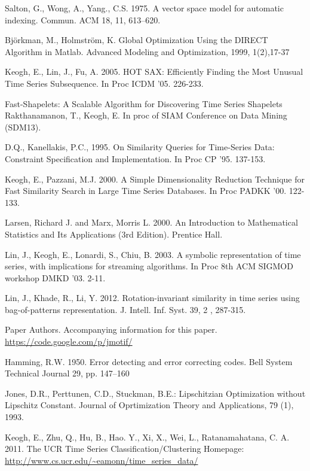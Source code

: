 \documentclass{llncs}
\begin{document}
\begin{thebibliography}{5}
Salton, G., Wong, A., Yang., C.S. 1975.
A vector space model for automatic indexing. 
Commun. ACM 18, 11, 613--620.

Björkman, M., Holmström, K.
Global Optimization Using the DIRECT Algorithm in Matlab.
Advanced Modeling and Optimization, 1999, 1(2),17-37

Keogh, E., Lin, J., Fu, A. 2005.
HOT SAX: Efficiently Finding the Most Unusual Time Series Subsequence. 
In Proc ICDM '05. 226-233.

Fast-Shapelets: A Scalable Algorithm for Discovering Time Series Shapelets
Rakthanamanon, T., Keogh, E.
In proc of SIAM Conference on Data Mining (SDM13).

D.Q., Kanellakis, P.C., 1995.
On Similarity Queries for Time-Series Data: Constraint Specification and Implementation. 
In Proc CP '95. 137-153.

Keogh, E., Pazzani, M.J. 2000.
A Simple Dimensionality Reduction Technique for Fast Similarity Search in Large Time Series
Databases. 
In Proc PADKK '00. 122-133.

Larsen, Richard J. and Marx, Morris L. 2000. 
An Introduction to Mathematical Statistics and Its Applications (3rd Edition).
Prentice Hall.

Lin, J., Keogh, E., Lonardi, S., Chiu, B. 2003.
A symbolic representation of time series, with implications for streaming algorithms. 
In Proc 8th ACM SIGMOD workshop DMKD '03. 2-11.

Lin, J., Khade, R., Li, Y. 2012.
Rotation-invariant similarity in time series using bag-of-patterns representation. 
J. Intell. Inf. Syst. 39, 2 , 287-315.

Paper Authors. 
Accompanying information for this paper. 
\url{https://code.google.com/p/jmotif/}

Hamming, R.W. 1950.
Error detecting and error correcting codes. 
Bell System Technical Journal 29, pp. 147--160

Jones, D.R., Perttunen, C.D., Stuckman, B.E.:
Lipschitzian Optimization without Lipschitz Constant.
Journal of Oprtimization Theory and Applications, 79 (1), 1993.

Keogh, E., Zhu, Q., Hu, B., Hao. Y.,  Xi, X., Wei, L., Ratanamahatana, C. A. 2011.
The UCR Time Series Classification/Clustering Homepage:
\url{http://www.cs.ucr.edu/~eamonn/time_series_data/}


\end{thebibliography}
\end{document}
